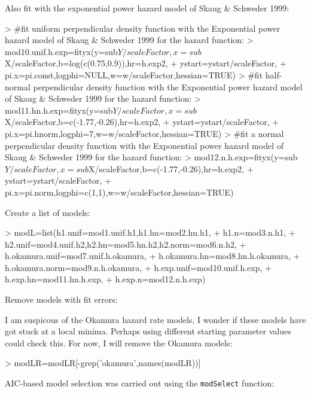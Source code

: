 \documentclass{article}
\begin{document}
Also fit with the exponential power hazard model of Skaug \& Schweder 1999:
\begin{Schunk}
\begin{Sinput}
> #fit uniform perpendicular density function with the Exponential power hazard model of Skaug & Schweder 1999 for the hazard function:
> mod10.unif.h.exp=fityx(y=sub$Y/scaleFactor,x=sub$X/scaleFactor,b=log(c(0.75,0.9)),hr=h.exp2,
+                  ystart=ystart/scaleFactor,
+                  pi.x=pi.const,logphi=NULL,w=w/scaleFactor,hessian=TRUE)
> #fit half-normal perpendicular density function with the Exponential power hazard model of Skaug & Schweder 1999 for the hazard function:
> mod11.hn.h.exp=fityx(y=sub$Y/scaleFactor,x=sub$X/scaleFactor,b=c(-1.77,-0.26),hr=h.exp2,
+                ystart=ystart/scaleFactor,
+                  pi.x=pi.hnorm,logphi=7,w=w/scaleFactor,hessian=TRUE)
> #fit a normal perpendicular density function with the Exponential power hazard model of Skaug & Schweder 1999 for the hazard function:
> mod12.n.h.exp=fityx(y=sub$Y/scaleFactor,x=sub$X/scaleFactor,b=c(-1.77,-0.26),hr=h.exp2,
+                ystart=ystart/scaleFactor,
+                  pi.x=pi.norm,logphi=c(1,1),w=w/scaleFactor,hessian=TRUE)
\end{Sinput}
\end{Schunk}
Create a list of models:
\begin{Schunk}
\begin{Sinput}
> modL=list(h1.unif=mod1.unif.h1,h1.hn=mod2.hn.h1,
+           h1.n=mod3.n.h1,
+                       h2.unif=mod4.unif.h2,h2.hn=mod5.hn.h2,h2.norm=mod6.n.h2,
+                       h.okamura.unif=mod7.unif.h.okamura,
+                       h.okamura.hn=mod8.hn.h.okamura,
+                       h.okamura.norm=mod9.n.h.okamura,
+                       h.exp.unif=mod10.unif.h.exp,
+                       h.exp.hn=mod11.hn.h.exp,
+                       h.exp.n=mod12.n.h.exp)
\end{Sinput}
\end{Schunk}
Remove models with fit errors:
\begin{Schunk}
\end{Schunk}
I am suspicous of the Okamura hazard rate models, I wonder if these models have got stuck at a local minima.  Perhaps using different starting parameter values could check this.  For now, I will remove the Okamura models:
\begin{Schunk}
\begin{Sinput}
> modLR=modLR[-grep('okamura',names(modLR))]
\end{Sinput}
\end{Schunk}
AIC-based model selection was carried out using the \texttt{modSelect} function:
\end{document}
